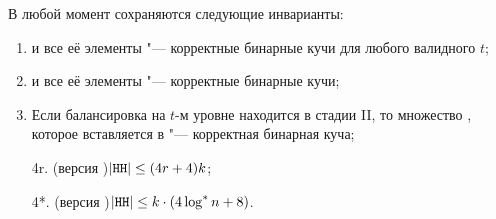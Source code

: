 \begin{theorem} \label{th:invar}
В любой момент сохраняются следующие инварианты:
\begin{enumerate}
\item \MH[t] и все её элементы "--- корректные бинарные кучи для любого валидного $t$;
\item \HH и все её элементы "--- корректные бинарные кучи;
\item Если балансировка на $t$-м уровне находится в стадии II, то множество , которое
вставляется в \MH[t+1] "--- корректная бинарная куча;
\item[4r.] (версия {\CH[r]})\quad $|\texttt{HH}| \leq (4r+4)k$;
\item[4*.] (версия {\CH[*]})\quad $|\texttt{HH}| \leq k\cdot (4 \log^* n + 8)$.
\addtocounter{enumi}{-1}
\end{enumerate}
\end{theorem}
